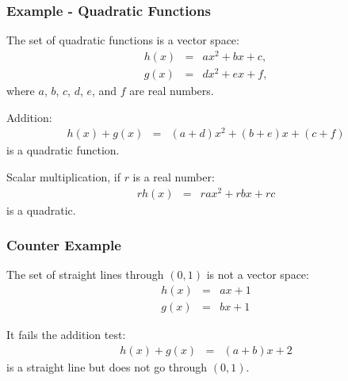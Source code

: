 \begin{frame}
  \frametitle{Example - Quadratic Functions}

  The set of quadratic functions is a vector space:
  \begin{eqnarray*}
    h(x) & = & a x^2 + bx + c, \\
    g(x) & = & dx^2 + ex + f,
  \end{eqnarray*}
  where $a$, $b$, $c$, $d$, $e$, and $f$ are real numbers.

  Addition:
  \begin{eqnarray*}
    h(x)+g(x) & = & (a+d) x^2 + (b+e) x + (c+f)
  \end{eqnarray*}
  is a quadratic function.

  Scalar multiplication, if $r$ is a real number:
  \begin{eqnarray*}
    r h(x) & = & ra x^2 + rb x + rc
  \end{eqnarray*}
  is a quadratic.

\end{frame}


\begin{frame}
  \frametitle{Counter Example}

  The set of straight lines through $(0,1)$ is not a vector space:
  \begin{eqnarray*}
    h(x) & = & ax + 1 \\
    g(x) & = & bx + 1
  \end{eqnarray*}

  It fails the addition test:
  \begin{eqnarray*}
    h(x) + g(x) & = & (a+b)x + 2
  \end{eqnarray*}
  is a straight line but does not go through $(0,1)$.

\end{frame}






